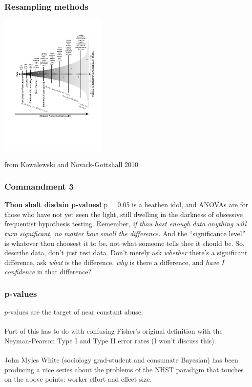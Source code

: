 \documentclass{beamer}
\begin{document}
  \begin{frame}
    \frametitle{Resampling methods}
    \centering \includegraphics[trim = 0pt 250pt 0pt 75pt, height = 200pt, keepaspectratio = true]{reality}
    
    \footnotesize{from Kowalewski and Novack-Gottshall 2010}
  \end{frame}
  
  
  
  \begin{frame}
    \frametitle{Commandment 3}
    \textbf{Thou shalt disdain p-values! }
    p = 0.05 is a heathen idol, and ANOVAs are for those who have not yet seen the light, still dwelling in the darkness of obsessive frequentist hypothesis testing. 
    Remember, \emph{if thou hast enough data anything will turn significant, no matter how small the difference.} 
    And the ``significance level'' is whatever thou choosest it to be, not what someone tells thee it should be. 
    So, describe data, don't just test data. 
    Don't merely ask \emph{whether} there's a significant difference, ask \emph{what} is the difference, \emph{why} is there a difference, and \emph{have I confidence} in that difference?
  \end{frame}
  
  
  
  \begin{frame}
    \frametitle{p-values}
    \(p\)-values are the target of near constant abuse.
    \\~\\
    Part of this has to do with confusing Fisher's original definition with the Neyman-Pearson Type I and Type II error rates (I won't discuss this).
    \\~\\
    John Myles White (sociology grad-student and consumate Bayesian) has been producing a nice series about the problems of the NHST paradigm that touches on the above points: worker effort and effect size.
  \end{frame}
  
\end{document}
